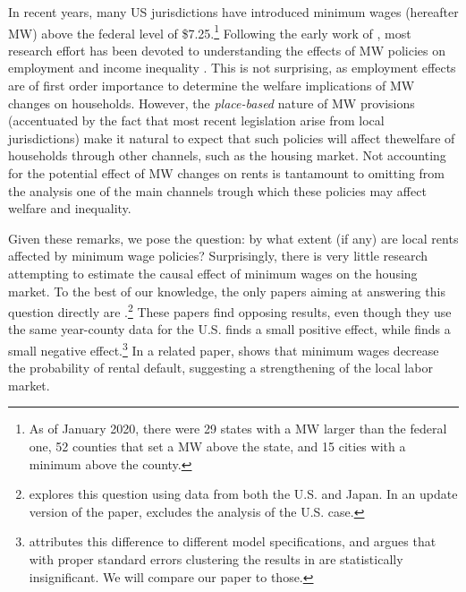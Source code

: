 
In recent years, many US jurisdictions have introduced minimum wages (hereafter MW) above the 
federal level of \$7.25.\footnote{As of January 2020, there were 29 states with a MW larger 
	than the federal one, 52 counties that set a MW above the state, and 15 cities with a 
	minimum above the county.}
Following the early work of \textcite{CardKrueger2000}, most research effort has been devoted 
to understanding the effects of MW policies on employment \parencite[e.g.,][]{Neumark2006, 
DubeEtAl2010, MeerWest2016, CegnizEtAl2019} and income inequality \parencite{Lee1999, 
AutorEtAl2016}. This is not surprising, as employment effects are of first order importance 
to determine the welfare implications of MW changes on households. However, the 
\textit{place-based} nature of MW provisions (accentuated by the fact that most recent 
legislation arise from local jurisdictions) make it natural to expect that such policies 
will affect thewelfare of households through other channels, such as the housing market. 
Not accounting for the potential effect of MW changes on rents is tantamount to omitting 
from the analysis one of the main channels trough which these policies may affect welfare 
and inequality.

Given these remarks, we pose the question: by what extent (if any) are local rents affected 
by minimum wage policies? Surprisingly, there is very little research attempting to estimate 
the causal effect of minimum wages on the housing market. To the best of our knowledge, the 
only papers aiming at answering this question directly are \textcite{Yamagishi2019, 
Yamagishi2020, Tidemann2018}.\footnote{\textcite{Yamagishi2019} explores this question using 
data from both the U.S. and Japan. In an update version of the paper, 
\textcite{Yamagishi2020} excludes the analysis of the U.S. case.} These papers find opposing 
results, even though they use the same year-county data for the U.S. \textcite{Yamagishi2019} 
finds a small positive effect, while \textcite{Tidemann2018} finds a small negative 
effect.\footnote{\textcite{Yamagishi2019} attributes this difference to different model 
	specifications, and argues that with proper standard errors clustering the results in 
	\textcite{Tidemann2018} are statistically insignificant. We will compare our paper to 
	those.} 
In a related paper, \textcite{AgarwalEtAl2019} shows that minimum wages decrease 
the probability of rental default, suggesting a strengthening of the local labor market.


